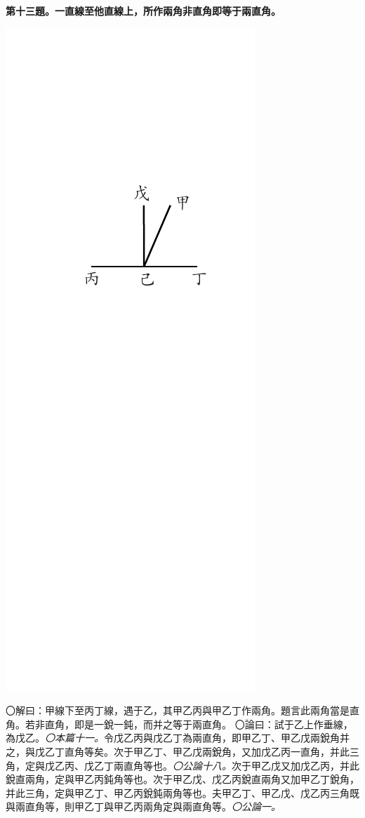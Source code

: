 \documentclass[12pt,b5paper,landscape]{article}
\newcommand{\ccom}[1]{{\footnotesize \emph{〇#1}}}
\newcommand{\bcom}[1]{〇#1}
\newcommand{\cthm}[1]{{
\vspace{8pt}

\bfseries #1}}
\begin{document}
\begin{multicols}{2}
\cthm{第十三題。一直線至他直線上，所作兩角非直角即等于兩直角。}
\begin{center}
\includegraphics[angle=90]{eu58}
\end{center}
\bcom{解曰：甲線下至丙丁線，遇于乙，其甲乙丙與甲乙丁作兩角。題言此兩角當是直角。若非直角，即是一銳一鈍，而并之等于兩直角。}
\bcom{論曰：試于乙上作垂線，為戊乙。\ccom{本篇十一。}令戊乙丙與戊乙丁為兩直角，即甲乙丁、甲乙戊兩銳角并之，與戊乙丁直角等矣。次于甲乙丁、甲乙戊兩銳角，又加戊乙丙一直角，并此三角，定與戊乙丙、戊乙丁兩直角等也。\ccom{公論十八。}次于甲乙戊又加戊乙丙，并此銳直兩角，定與甲乙丙鈍角等也。次于甲乙戊、戊乙丙銳直兩角又加甲乙丁銳角，并此三角，定與甲乙丁、甲乙丙銳鈍兩角等也。夫甲乙丁、甲乙戊、戊乙丙三角既與兩直角等，則甲乙丁與甲乙丙兩角定與兩直角等。\ccom{公論一。}}


\end{multicols}
\end{document}

